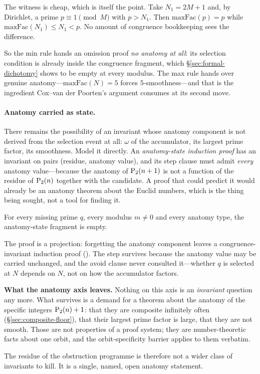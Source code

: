 \noindent
The witness is cheap, which is itself the point.  Take $N_1 = 2M+1$ and,
by Dirichlet, a prime $p \equiv 1 \pmod M$ with $p > N_1$.  Then
$\mathrm{maxFac}(p) = p$ while $\mathrm{maxFac}(N_1) \leq N_1 < p$.  No
amount of congruence bookkeeping sees the difference.

So the min rule hands an omission proof \emph{no anatomy at all}: its
selection condition is already inside the congruence fragment, which
\S\ref{sec:formal-dichotomy} shows to be empty at every modulus.  The max
rule hands over genuine anatomy---$\mathrm{maxFac}(N) = 5$ forces
$5$-smoothness---and that is the ingredient Cox--van der Poorten's
argument consumes at its second move.

\paragraph{Anatomy carried as state.}
There remains the possibility of an invariant whose anatomy component is
not derived from the selection event at all: $\omega$ of the accumulator,
its largest prime factor, its smoothness.  Model it directly.  An
\emph{anatomy-state induction proof} has an invariant on pairs
(residue, anatomy value), and its step clause must admit \emph{every}
anatomy value---because the anatomy of $\mathrm{P}_{2}(n+1)$ is not a function
of the residue of $\mathrm{P}_{2}(n)$ together with the candidate.  A proof
that could predict it would already be an anatomy theorem about the
Euclid numbers, which is the thing being sought, not a tool for finding
it.

\begin{theorem}
\label{thm:anatomy-inert}
For every missing prime $q$, every modulus $m \neq 0$ and every anatomy
type, the anatomy-state fragment is empty.
\end{theorem}

The proof is a projection: forgetting the anatomy component leaves a
congruence-invariant induction proof
().
The step survives because the anatomy value may be carried unchanged, and
the avoid clause never consulted it---whether $q$ is selected at $N$
depends on $N$, not on how the accumulator factors.

\begin{frontierbox}
\textbf{What the anatomy axis leaves.}
Nothing on this axis is an \emph{invariant} question any more.  What
survives is a demand for a theorem about the anatomy of the specific
integers $\mathrm{P}_{2}(n)+1$: that they are composite infinitely often
(\S\ref{sec:composite-floor}), that their largest prime factor is large,
that they are not smooth.  Those are not properties of a proof system;
they are number-theoretic facts about one orbit, and the
orbit-specificity barrier applies to them verbatim.

The residue of the obstruction programme is therefore not a wider class
of invariants to kill.  It is a single, named, open anatomy statement.
\end{frontierbox}
